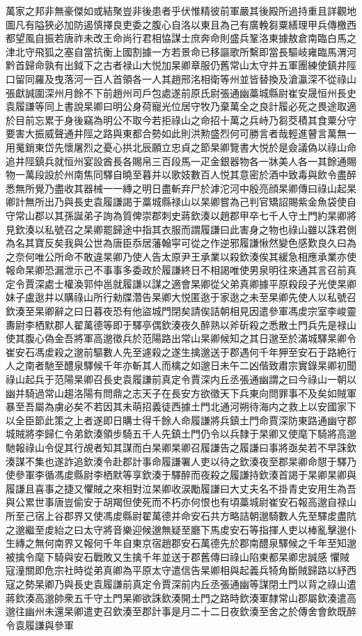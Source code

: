 萬家之邦非無豪傑如或結聚豈非後患者乎伏惟精彼前軍嚴其後殿所過持重且詳觀地圖凡有隘狹必加防遏慎擇良吏委之腹心自洛以東且為己有廣輓芻粟繕理甲兵傳檄西都望風自振若唐祚未改王命尚行君相恊謀士庶奔命則盛兵鞏洛東據敖倉南臨白馬之津北守飛狐之塞自當抗衡上國割據一方若景命已移謳歌所繫即當長驅岐雍臨馬渭河黔首歸命孰有出鉞下之古者禄山大悦加杲卿章服仍舊常山太守并五軍團練使鎮井陘口留同羅及曳落河一百人首領各一人其趙邢洺相衛等州並皆替換及滄瀛深不從祿山張獻誠圍深州月餘不下前趙州司戶包處遂前原氏尉張通幽藁城縣尉崔安晟恒州長史袁履謙等同上書說杲卿曰明公身荷寵光位居守牧乃棄萬全之良計履必死之畏途取適於目前忘累于身後竊為明公不取今若拒祿山之命招十萬之兵峙乃芻茭積其食粟分守要害大振威聲通井陘之路與東都合勢如此則洪勲盛烈何可勝言者哉輕進瞽言萬無一用䰟銷東岱先懷屠烈之憂心拱北辰願立忠貞之節杲卿覽書大悦於是僉議偽以祿山命追井陘鎮兵就恒州宴設酋長各賜帛三百段馬一疋金銀器物各一牀美人各一其餘通賜物一萬段設於州南焦同驛自曉至暮并以歌妓數百人悦其意密於酒中致毒與飲令盡醉悉無所覺乃盡收其器械一一縳之明日盡斬弃尸於滹沱河中殷亮顔杲卿傳曰祿山起杲卿計無所出乃與長史袁履謙謁于藁城縣禄山以杲卿嘗為己判官矯詔賜紫金魚袋使自守常山郡以其孫誕弟子詢為質俾崇郡刺史蔣欽湊以趙郡甲卒七千人守土門約杲卿將見欽湊以私號召之杲卿罷歸途中指其衣服而謂履謙曰此害身之物也祿山雖以誅君側為名其寶反矣我與公世為唐臣忝居藩翰寜可從之作逆邪履謙愀然變色感歎良久曰為之奈何唯公所命不敢違杲卿乃使人告太原尹王承業以殺欽湊俟其緩急相應承業亦使報命杲卿恐漏泄示己不事事多委政於履謙終日不相謁唯使男泉明往來通其言召前真定令賈深處士權渙郭仲邕就履謙以謀之適會杲卿從父弟真卿據平原殺段子光使杲卿妹子盧逖并以購祿山所行勑牒濳告杲卿大悦匿逖于家逖之未至杲卿先使人以私號召欽湊至杲卿辭之曰日暮夜恐有他盜城門閉矣請俟詰朝相見因遣參軍馮䖍宗室李峻靈夀尉李栖默郡人翟萬德等即于驛亭偶欽湊夜久醉熟以斧斫殺之悉散土門兵先是禄山使其腹心偽金吾將軍高邈徵兵於范陽路出常山杲卿候知之其日邈至於滿城驛杲卿令崔安石馮䖍殺之邈前驅數人先至遽殺之遂生擒邈送于郡遇何千年狎至安石于路絶行人之南者馳至醴泉驛候千年亦斬其人而檎之如邈日未午二凶偕致肅宗實錄杲卿初聞祿山起兵于范陽杲卿召長史袁履謙前真定令賈深内丘丞張通幽謂之曰今祿山一朝以幽并騎過常山趨洛陽有問鼎之志天子在長安方欲徵天下兵東向問罪事不及矣如賊軍暴至吾屬為虜必矣不若因其未萌招義徒西據土門北通河朔待海内之救上以安國家下以全臣節此策之上者遂即日購士得千餘人命履謙將兵鎮土門命賈深防東路通幽守郡城賊將李歸仁令弟欽湊領步騎五千人先鎮土門仍令以兵隸于杲卿又使麾下騎將高邈馳報祿山令促其行覘者知其謀而白杲卿杲卿召履謙告之履謙曰事將亟矣若不早誅欽湊謀不集也遂詐追欽湊令赴郡計事命履謙署人吏以待之欽湊夜至郡杲卿命憇于驛乃使參軍李循馮䖍縣尉李栖默等享欽湊于驛醉而夜殺之履謙持欽湊首謁于杲卿杲卿與履謙且喜事之捷又懼賊之來相對泣杲卿收涙勵履謙曰大丈夫名不掛青史安用生為吾與公累世事唐豈偷安于胡羯但使死而不朽亦何恨也有頃藁城尉崔安石報高邈自禄山所至己宿上谷郡界又使馮䖍縣尉翟萬德并命安石共方略詰朝邈騎數人先至驛䖍盡阬之邈繼至䖍紿之曰太守將音樂迎候邈無疑至廳下馬䖍安石等指揮人吏以棒亂擊邈仆生縳之無何南界又報何千年自東京宿趙郡安石萬德先於郡南醴泉驛候之千年至知邈被擒令麾下騎與安石戰敗又生擒千年並送于郡舊傳曰祿山陷東都杲卿忠誠感懼賊寇潼關即危宗社時從弟真卿為平原太守遣信告杲卿相與起義兵犄角斷賊歸路以紓西寇之勢杲卿乃與長史袁履謙前真定令賈深前内丘丞張通幽等謀閉土門以背之祿山遣蔣欽湊高邈帥衆五千守土門杲卿欲誅欽湊開土門之路時欽湊軍隸常山郡屬欽湊遣高邈往幽州未還杲卿遣吏召欽湊至郡計事是月二十二日夜欽湊至舍之於傳舍會飲既醉令袁履謙與參軍
